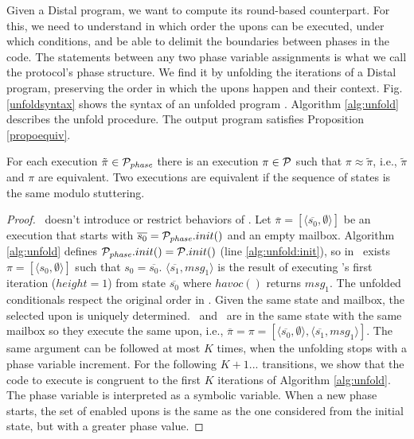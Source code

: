 Given a Distal program, we want to compute its round-based counterpart. For this, we need to understand in which order the upons can be executed, under which conditions, and be able to delimit the boundaries between phases in the code.
The statements between any two phase variable assignments is what we call the protocol's phase structure. We find it by unfolding the iterations of a Distal program, preserving the order in which the upons happen and their context. Fig. \ref{unfoldsyntax} shows the syntax of an unfolded program \Pclosed. Algorithm \ref{alg:unfold} describes the unfold procedure. The output program satisfies Proposition \ref{propoequiv}.

\begin{proposition}
For each execution $\tilde{\pi} \in \mathcal{P}_{\mathit{phase}}$ there is an execution $\pi \in \mathcal{P}$ such that $\pi \approx \tilde{\pi}$, i.e., $\tilde{\pi}$ and $\pi$ are equivalent. Two executions are equivalent if the sequence of states is the same modulo stuttering. 
\label{propoequiv}
\end{proposition}

\begin{proof}
\Pclosed\ doesn't introduce or restrict behaviors of \Pasync. Let $\overline{\pi} = [\langle \overline{s_0}, \emptyset \rangle]$ be an execution that starts with $\overline{s_0} = \mathcal{P}_{\mathit{phase}}.init()$ and an empty mailbox. Algorithm \ref{alg:unfold} defines $\mathcal{P}_{\mathit{phase}}.init() = \mathcal{P}.init()$ (line \ref{alg:unfold:init}), so in \Pasync\ exists $\pi = [\langle s_0, \emptyset \rangle]$ such that $s_0 = \overline{s_0} $. 
$\langle \overline{s_1}, msg_1 \rangle$ is the result of executing \Pclosed's first iteration ($height = 1$) from state $\overline{s_0}$ where $havoc()$ returns $msg_1$. 
The unfolded conditionals respect the original order in \Pasync. Given the same state and mailbox, the selected upon is uniquely determined. \Pclosed\ and \Pasync\ are in the same state with the same mailbox so they execute the same upon, i.e., $\overline{\pi} = \pi = [\langle \overline{s_0}, \emptyset \rangle, \langle \overline{s_1}, msg_1 \rangle]$. The same argument can be followed at most $K$ times, when the unfolding stops with a phase variable increment. For the following $\mathit{K+1}...$ transitions, we show that the code to execute is congruent to the first $K$ iterations of Algorithm \ref{alg:unfold}. The phase variable is interpreted as a symbolic variable. When a new phase starts, the set of enabled upons is the same as the one considered from the initial state, but with a greater phase value.
\end{proof}

